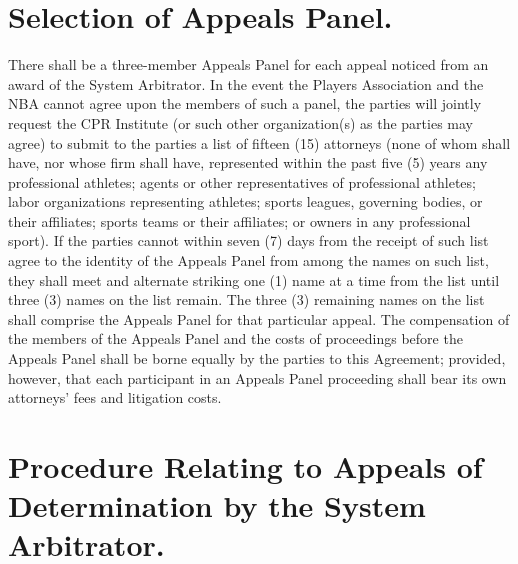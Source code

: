 \documentclass[
]{book}
\begin{document}
\hypertarget{selection-of-appeals-panel.}{%
\section{Selection of Appeals Panel.}\label{selection-of-appeals-panel.}}

There shall be a three-member Appeals Panel for each appeal noticed from an award of the System Arbitrator. In the event the Players Association and the NBA cannot agree upon the members of such a panel, the parties will jointly request the CPR Institute (or such other organization(s) as the parties may agree) to submit to the parties a list of fifteen (15) attorneys (none of whom shall have, nor whose firm shall have, represented within the past five (5) years any professional athletes; agents or other representatives of professional athletes; labor organizations representing athletes; sports leagues, governing bodies, or their affiliates; sports teams or their affiliates; or owners in any professional sport). If the parties cannot within seven (7) days from the receipt of such list agree to the identity of the Appeals Panel from among the names on such list, they shall meet and alternate striking one (1) name at a time from the list until three (3) names on the list remain. The three (3) remaining names on the list shall comprise the Appeals Panel for that particular appeal. The compensation of the members of the Appeals Panel and the costs of proceedings before the Appeals Panel shall be borne equally by the parties to this Agreement; provided, however, that each participant in an Appeals Panel proceeding shall bear its own attorneys' fees and litigation costs.

\hypertarget{procedure-relating-to-appeals-of-determination-by-the-system-arbitrator.}{%
\section{Procedure Relating to Appeals of Determination by the System Arbitrator.}\label{procedure-relating-to-appeals-of-determination-by-the-system-arbitrator.}}
\end{document}
